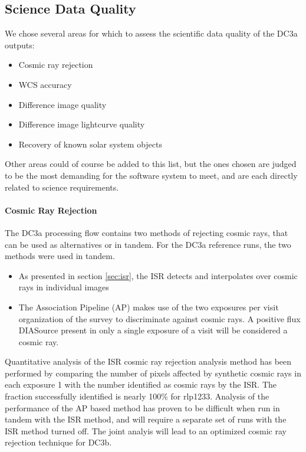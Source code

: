 \subsection{Science Data Quality}
We chose several areas for which to assess the scientific data quality of the DC3a outputs:
\begin{itemize}
\item Cosmic ray rejection
\item WCS accuracy
\item Difference image quality
\item Difference image lightcurve quality
\item Recovery of known solar system objects
\end{itemize}
Other areas could of course be added to this list, but the ones chosen
are judged to be the most demanding for the software system to meet,
and are each directly related to science requirements. 
\paragraph{Cosmic Ray Rejection}
The DC3a processing flow contains two methods of rejecting cosmic
rays, that can be used as alternatives or in tandem.  For the DC3a
reference runs, the two methods were used in tandem.
\begin{itemize}
\item As presented in section \ref{sec:isr}, the ISR detects and
  interpolates over cosmic rays in individual images
\item The Association Pipeline (AP) makes use of the two exposures per
  visit organization of the survey to discriminate against cosmic
  rays.  A positive flux DIASource present in only a single exposure
  of a visit will be considered a cosmic ray.
\end{itemize}
Quantitative analysis of the ISR cosmic ray rejection analysis method
has been performed by comparing the number of pixels affected by
synthetic cosmic rays in each exposure 1 with the number identified as
cosmic rays by the ISR.  The fraction successfully identified is
nearly 100\% for rlp1233.  Analysis of the performance of the AP based
method has proven to be difficult when run in tandem with the ISR
method, and will require a separate set of runs with the ISR method
turned off.  The joint analyis will lead to an optimized cosmic ray
rejection technique for DC3b.

